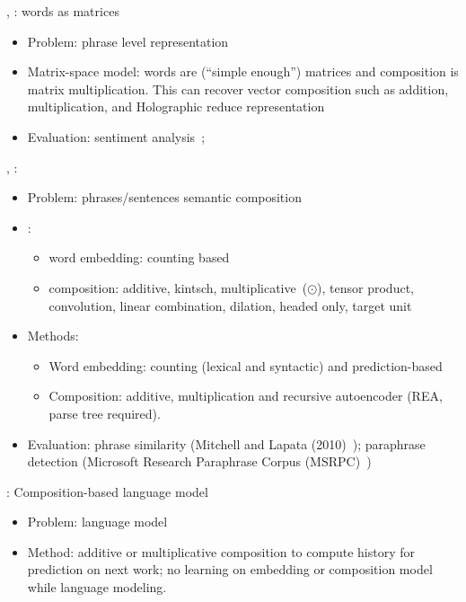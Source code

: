 \documentclass{article} %
\begin{document}
\cite{rudolph2010compositional}, \cite{yessenalina2011compositional}: words as matrices
\begin{itemize}
\item Problem: phrase level representation
\item Matrix-space model: words are (``simple enough'') matrices and
	composition is matrix multiplication. This can recover vector composition
	such as addition, multiplication, and Holographic reduce representation~
	\cite{plate1991holographic}
\item Evaluation: sentiment analysis~\cite{yessenalina2011compositional};
\end{itemize}

\cite{mitchell2008vector}, \cite{blacoe2012comparison}:
\begin{itemize}
\item Problem: phrases/sentences semantic composition
\item \cite{mitchell2008vector}:
	\begin{itemize}
	\item word embedding: counting based
	\item composition: additive, kintsch, multiplicative~($\odot$), tensor
		product, convolution, linear combination, dilation, headed only, target
		unit
	\end{itemize}
\item Methods:
	\begin{itemize}
	\item Word embedding: counting (lexical and syntactic) and prediction-based
	\item Composition: additive, multiplication and recursive autoencoder (REA,
			parse tree required).
	\end{itemize}
\item Evaluation: phrase similarity (Mitchell and Lapata (2010)~); paraphrase
	detection (Microsoft Research Paraphrase Corpus (MSRPC)~)
\end{itemize}

\cite{mitchell2009language}: Composition-based language model
\begin{itemize}
\item Problem: language model
\item Method: additive or multiplicative composition to compute history for
	prediction on next work; no learning on embedding or composition model
	while language modeling.
\end{itemize}
\end{document}
